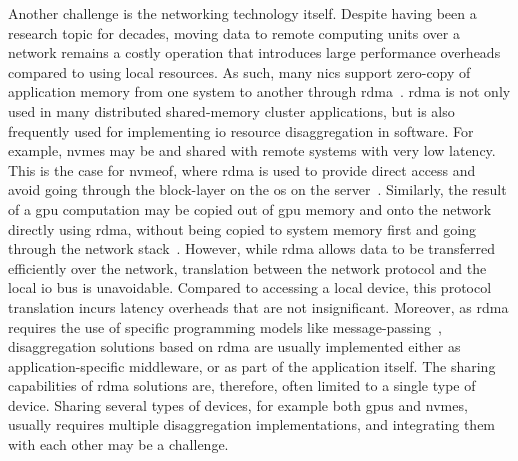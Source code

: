 Another challenge is the networking technology itself. 
%
Despite having been a research topic for decades, moving data to remote computing units over a network remains a costly operation that introduces large performance overheads compared to using local resources.
%
As such, many \glspl{nic} support zero-copy of application memory from one system to another through \gls{rdma}~\cite{Huang2012}.
%
\Gls{rdma} is not only used in many distributed shared-memory cluster applications, but is also frequently used for implementing \gls{io} resource \gls{disaggregation} in software.
%
For example, \glspl{nvme} may be  and shared with remote systems with very low latency.
This is the case for \gls{nvmeof}, where \gls{rdma} is used to provide direct access and avoid going through the block-layer on the \gls{os} on the server~\cite{Guz2018}.
%
Similarly, the result of a \gls{gpu} computation may be copied out of \gls{gpu} memory and onto the network directly using \gls{rdma}, without being copied to system memory first and going through the network stack~\cite{Venkatesh2014}.
%
However, while \gls{rdma} allows data to be transferred efficiently over the network, translation between the network protocol and the local \gls{io} bus is unavoidable. 
%
Compared to accessing a local device, this protocol translation incurs latency overheads that are not insignificant.
%
Moreover, as \gls{rdma} requires the use of specific programming models like message-passing~\cite{Jiang2004}, \gls{disaggregation} solutions based on \gls{rdma} are usually implemented either as application-specific \gls{middleware}, or as part of the application itself.
%
The sharing capabilities of \gls{rdma} solutions are, therefore, often limited to a single type of device.
Sharing several types of devices, for example both \glspl{gpu} and \glspl{nvme}, usually requires multiple \gls{disaggregation} implementations, and integrating them with each other may be a challenge.



